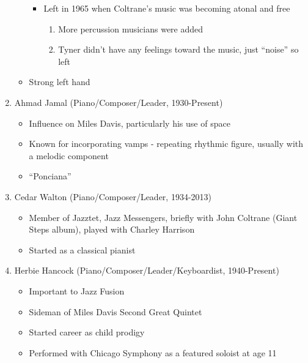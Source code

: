 \documentclass[]{article}
\providecommand{\tightlist}{%
  \setlength{\itemsep}{0pt}\setlength{\parskip}{0pt}}
\begin{document}
\begin{enumerate}
\begin{itemize}
    \begin{itemize}
    \tightlist
    \item
      Left in 1965 when Coltrane's music was becoming atonal and free

      \begin{enumerate}
      \def\labelenumii{\roman{enumii}.}
      \tightlist
      \item
        More percussion musicians were added
      \item
        Tyner didn't have any feelings toward the music, just ``noise''
        so left
      \end{enumerate}
    \end{itemize}
  \item
    Strong left hand
  \end{itemize}
\item
  Ahmad Jamal (Piano/Composer/Leader, 1930-Present)

  \begin{itemize}
  \tightlist
  \item
    Influence on Miles Davis, particularly his use of space
  \item
    Known for incorporating vamps - repeating rhythmic figure, usually
    with a melodic component
  \item
    ``Ponciana''
  \end{itemize}
\item
  Cedar Walton (Piano/Composer/Leader, 1934-2013)

  \begin{itemize}
  \tightlist
  \item
    Member of Jazztet, Jazz Messengers, briefly with John Coltrane
    (Giant Steps album), played with Charley Harrison
  \item
    Started as a classical pianist
  \end{itemize}
\item
  Herbie Hancock (Piano/Composer/Leader/Keyboardist, 1940-Present)

  \begin{itemize}
  \tightlist
  \item
    Important to Jazz Fusion
  \item
    Sideman of Miles Davis Second Great Quintet
  \item
    Started career as child prodigy
  \item
    Performed with Chicago Symphony as a featured soloist at age 11


\end{itemize}
\end{enumerate}
\end{document}
